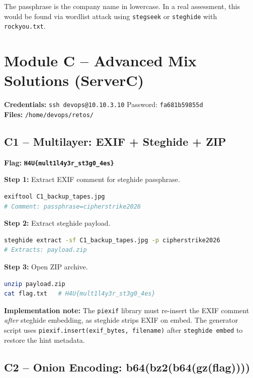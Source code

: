 \documentclass[a4paper, 12pt]{article}
\newcommand{\flag}[1]{\texttt{\color{flagcolor}\bfseries #1}}
\begin{document}
The passphrase is the company name in lowercase. In a real assessment, this
would be found via wordlist attack using \texttt{stegseek} or \texttt{steghide}
with \texttt{rockyou.txt}.

\section{Module C -- Advanced Mix Solutions (ServerC)}

\textbf{Credentials:} \texttt{ssh devops@10.10.3.10} \quad Password: \texttt{fa681b59855d}\\
\textbf{Files:} \texttt{/home/devops/retos/}

\subsection{C1 -- Multilayer: EXIF + Steghide + ZIP}

\textbf{Flag:} \flag{H4U\{mult1l4y3r\_st3g0\_4es\}}

\textbf{Step 1:} Extract EXIF comment for steghide passphrase.
\begin{lstlisting}[language=bash]
exiftool C1_backup_tapes.jpg
# Comment: passphrase=cipherstrike2026
\end{lstlisting}

\textbf{Step 2:} Extract steghide payload.
\begin{lstlisting}[language=bash]
steghide extract -sf C1_backup_tapes.jpg -p cipherstrike2026
# Extracts: payload.zip
\end{lstlisting}

\textbf{Step 3:} Open ZIP archive.
\begin{lstlisting}[language=bash]
unzip payload.zip
cat flag.txt   # H4U{mult1l4y3r_st3g0_4es}
\end{lstlisting}

\begin{mdframed}[backgroundcolor=labgray, linewidth=0.5pt]
\textbf{Implementation note:} The \texttt{piexif} library must re-insert the EXIF
comment \emph{after} steghide embedding, as steghide strips EXIF on embed.
The generator script uses \texttt{piexif.insert(exif\_bytes, filename)} after
\texttt{steghide embed} to restore the hint metadata.
\end{mdframed}

\subsection{C2 -- Onion Encoding: b64(bz2(b64(gz(flag))))}
\end{document}
